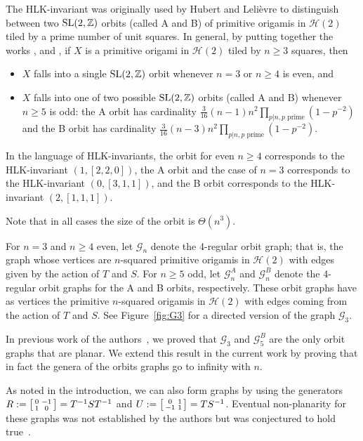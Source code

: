 \documentclass[a4paper,11pt]{amsart}
\numberwithin{equation}{section}
\numberwithin{figure}{section}
\numberwithin{table}{section}
\newcommand{\calH}{\mathcal{H}}
\DeclareMathOperator{\SL}{{\rm{SL}}}
\begin{document}
The HLK-invariant was originally used by Hubert and Leli\`evre \cite{HL} to distinguish between two $\SL(2,\mathbb{Z})$ orbits (called A and B) of primitive origamis in $\mathcal{H}(2)$ tiled by a prime number of unit squares. In general, by putting together the works \cite{HL}, \cite{McM} and \cite{LR}, if $X$ is a primitive origami in $\mathcal{H}(2)$ tiled by $n\geq 3$ squares, then 
\begin{itemize}
    \item $X$ falls into a single $\SL(2,\mathbb{Z})$ orbit whenever $n=3$ or $n\geq 4$ is even, and 
    \item $X$ falls into one of two possible $\SL(2,\mathbb{Z})$ orbits (called A and B) whenever $n\geq 5$ is odd: the A orbit has cardinality $\frac{3}{16}(n-1)n^2\prod\limits_{p|n, p \textrm{ prime}}(1-p^{-2})$ and the B orbit has cardinality $\frac{3}{16}(n-3)n^2\prod\limits_{p|n, p \textrm{ prime}}(1-p^{-2})$.
\end{itemize}
In the language of HLK-invariants, the orbit for even $n\geq 4$ corresponds to the HLK-invariant $(1,[2,2,0])$, the A orbit and the case of $n=3$ corresponds to the HLK-invariant $(0,[3,1,1])$, and the B orbit corresponds to the HLK-invariant $(2,[1,1,1])$.

Note that in all cases the size of the orbit is $\Theta(n^{3})$.

For $n = 3$ and $n\geq 4$ even, let $\mathcal{G}_{n}$ denote the 4-regular orbit graph; that is, the graph whose vertices are $n$-squared primitive origamis in $\calH(2)$ with edges given by the action of $T$ and $S$. For $n\geq 5$ odd, let $\mathcal{G}_{n}^{A}$ and $\mathcal{G}_{n}^{B}$ denote the 4-regular orbit graphs for the A and B orbits, respectively. These orbit graphs have as vertices the primitive $n$-squared origamis in $\calH(2)$ with edges coming from the action of $T$ and $S$. See Figure~\ref{fig:G3} for a directed version of the graph $\mathcal{G}_{3}$.

In previous work of the authors~\cite{JM}, we proved that $\mathcal{G}_{3}$ and $\mathcal{G}_{5}^{B}$ are the only orbit graphs that are planar. We extend this result in the current work by proving that in fact the genera of the orbits graphs go to infinity with $n$.

As noted in the introduction, we can also form graphs by using the generators $R:=\begin{bsmallmatrix}
    0 & -1 \\
    1 & 0
\end{bsmallmatrix} = T^{-1}ST^{-1}$ and $U:=\begin{bsmallmatrix}
    0 & 1 \\
    -1 & 1
\end{bsmallmatrix} = TS^{-1}$. Eventual non-planarity for these graphs was not established by the authors but was conjectured to hold true~\cite[Conjecture 1.2]{JM}.
\end{document}
